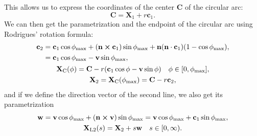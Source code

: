 			This allows us to express the coordinates of the center $\mathbf{C}$ of the circular arc:
				\begin{equation}
					\mathbf{C} = \mathbf{X}_1+r\mathbf{c}_1.
				\end{equation}
			We can then get the parametrization and the endpoint of the circular arc using Rodrigues' rotation formula:
				\begin{gather}
					\begin{aligned}
						\mathbf{c}_2 &= \mathbf{c}_1\cos\phi_\text{max} + (\mathbf{n}\cross\mathbf{c}_1)\sin\phi_\text{max} + \mathbf{n}(\mathbf{n}\cdot\mathbf{c}_1)(1-\cos\phi_\text{max}),\\
						&= \mathbf{c}_1\cos\phi_\text{max} - \mathbf{v}\sin\phi_\text{max},
					\end{aligned}\\
					\mathbf{X}_\text{C}(\phi) = \mathbf{C} - r(\mathbf{c}_1\cos\phi - \mathbf{v}\sin\phi) \quad \phi\in[0,\phi_\text{max}],\\
					\mathbf{X}_2 = \mathbf{X}_\text{C}(\phi_\text{max}) = \mathbf{C} - r\mathbf{c}_2,
				\end{gather}
			and if we define the direction vector of the second line, we also get its parametrization
				\begin{gather}
					\mathbf{w} = \mathbf{v}\cos\phi_\text{max} + (\mathbf{n}\cross\mathbf{v})\sin\phi_\text{max} = \mathbf{v}\cos\phi_\text{max} + \mathbf{c}_1\sin\phi_\text{max},\\
					\mathbf{X}_\text{L2}(s) = \mathbf{X}_2 + s\mathbf{w} \quad s\in[0,\infty).
				\end{gather}
				
